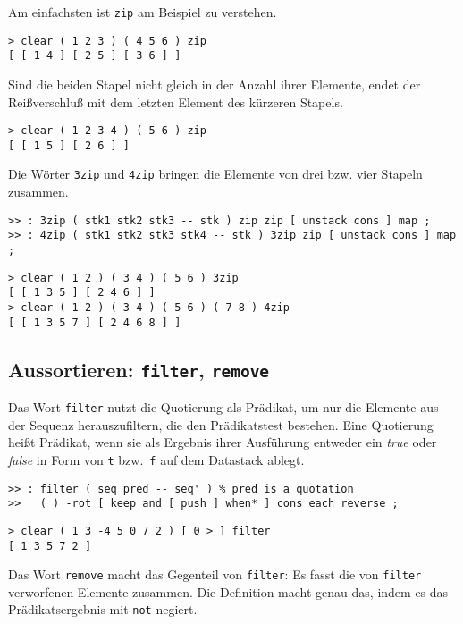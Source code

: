 Am einfachsten ist \verb|zip| am Beispiel zu verstehen.

\begin{verbatim}
> clear ( 1 2 3 ) ( 4 5 6 ) zip
[ [ 1 4 ] [ 2 5 ] [ 3 6 ] ]
\end{verbatim}

Sind die beiden Stapel nicht gleich in der Anzahl ihrer Elemente, endet der Reißverschluß mit dem letzten Element des kürzeren Stapels.

\begin{verbatim}
> clear ( 1 2 3 4 ) ( 5 6 ) zip
[ [ 1 5 ] [ 2 6 ] ]
\end{verbatim}

Die Wörter \verb|3zip| und \verb|4zip| bringen die Elemente von drei bzw. vier Stapeln zusammen.

\begin{verbatim}
>> : 3zip ( stk1 stk2 stk3 -- stk ) zip zip [ unstack cons ] map ;
>> : 4zip ( stk1 stk2 stk3 stk4 -- stk ) 3zip zip [ unstack cons ] map ;
\end{verbatim}

\begin{verbatim}
> clear ( 1 2 ) ( 3 4 ) ( 5 6 ) 3zip
[ [ 1 3 5 ] [ 2 4 6 ] ]
> clear ( 1 2 ) ( 3 4 ) ( 5 6 ) ( 7 8 ) 4zip
[ [ 1 3 5 7 ] [ 2 4 6 8 ] ]
\end{verbatim}

\subsection{Aussortieren: \texttt{filter}, \texttt{remove}}

Das Wort \verb|filter| nutzt die Quotierung als Prädikat, um nur die Elemente aus der Sequenz herauszufiltern, die den Prädikatstest bestehen. Eine Quotierung heißt Prädikat, wenn sie als Ergebnis ihrer Ausführung entweder ein \emph{true} oder \emph{false} in Form von \verb|t| bzw.\ \verb|f| auf dem Datastack ablegt.

\begin{verbatim}
>> : filter ( seq pred -- seq' ) % pred is a quotation
>>   ( ) -rot [ keep and [ push ] when* ] cons each reverse ;
\end{verbatim}

\begin{verbatim}
> clear ( 1 3 -4 5 0 7 2 ) [ 0 > ] filter
[ 1 3 5 7 2 ]
\end{verbatim}

Das Wort \verb|remove| macht das Gegenteil von \verb|filter|: Es fasst die von \verb|filter| verworfenen Elemente zusammen. Die Definition macht genau das, indem es das Prädikatsergebnis mit \verb|not| negiert.

